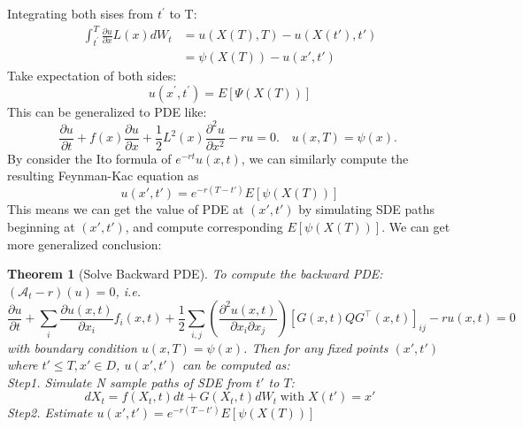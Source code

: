 \documentclass{ctexart}
\newtheorem{theorem}{Theorem}
\begin{document}
Integrating both sises from $t^{\prime}$  to  T:
\begin{equation}
    \begin{aligned}
        \int_{t^{\prime}}^{T} \frac{\partial u}{\partial x} L(x) d W_{t} &= u(X(T), T) - u(X(t'), t')\\
        &= \psi(X(T)) - u(x', t')
    \end{aligned}
\end{equation}
Take expectation of both sides:
\begin{equation}
    u\left(x^{\prime}, t^{\prime}\right)=E[\Psi(X(T))]
\end{equation}  
This can be generalized to PDE like:
\begin{equation}
    \frac{\partial u}{\partial t}+f(x) \frac{\partial u}{\partial x}+\frac{1}{2} L^{2}(x) \frac{\partial^{2} u}{\partial x^{2}}-r u=0 . \quad u(x, T)=\psi(x) \text {. }
\end{equation}
By consider the Ito formula of $e^{-rt}u(x, t)$, we can similarly compute the resulting Feynman-Kac equation as 
\begin{equation}
    u(x', t') = e^{-r(T-t')}E\left[\psi(X(T))\right]
\end{equation}
This means we can get the value of PDE at $(x', t')$ by simulating SDE paths beginning at $(x', t')$, and compute corresponding $E\left[\psi(X(T))\right]$. We can get more generalized conclusion:
\begin{theorem}[Solve Backward PDE]

    To compute the backward PDE: $(\mathcal{A}_t-r)(u)=0$, i.e.
    \begin{equation}
        \frac{\partial u}{\partial t} + \sum_{i} \frac{\partial u(x, t)}{\partial x_{i}} f_{i}(x, t)+\frac{1}{2} \sum_{i, j}\left(\frac{\partial^{2}u(x, t)}{\partial x_{i} \partial x_{j}}\right)\left[G(x, t)Q G^{\top}(x, t)\right]_{i j} - ru(x, t)=0
    \end{equation}
    with boundary condition $u(x, T)=\psi(x)$. Then for any fixed points $(x', t')$ where $t'\leq T, x'\in D$, $u(x', t')$ can be computed as:\\
    Step1. Simulate N sample paths of SDE from $t'$ to $T$:
    \begin{equation}
        dX_t=f(X_t, t)dt + G(X_t, t)dW_t\operatorname{with}X(t')=x'
    \end{equation}
    Step2. Estimate $u(x', t') = e^{-r(T-t')}E\left[\psi(X(T))\right]$
\end{theorem}
\end{document}
